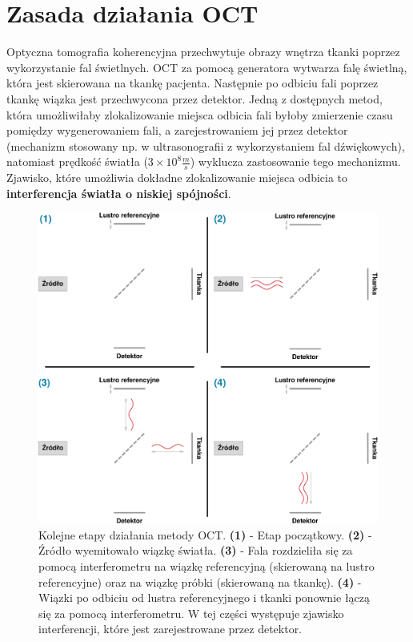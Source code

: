 
\section{Zasada działania OCT}
\label{sec:obrazowanie_oct:metoda_oct}

Optyczna tomografia koherencyjna przechwytuje obrazy wnętrza tkanki poprzez wykorzystanie fal świetlnych. OCT za pomocą generatora wytwarza falę świetlną, która jest skierowana na tkankę pacjenta. Następnie po odbiciu fali poprzez tkankę wiązka jest przechwycona przez detektor. Jedną z dostępnych metod, która umożliwiłaby zlokalizowanie miejsca odbicia fali byłoby zmierzenie czasu pomiędzy wygenerowaniem fali, a zarejestrowaniem jej przez detektor (mechanizm stosowany np. w ultrasonografii z wykorzystaniem fal dźwiękowych), natomiast prędkość światła (\(3\times10^8 \frac{m}{s}\)) wyklucza zastosowanie tego mechanizmu. Zjawisko, które umożliwia dokładne zlokalizowanie miejsca odbicia to \textbf{interferencja światła o niskiej spójności}.

\begin{figure}[htb]
	\centering
	\includegraphics[width=\textwidth]{gfx/oct_phases}
	\caption{Kolejne etapy działania metody OCT. \textbf{(1)} - Etap początkowy. \textbf{(2)} - Źródło wyemitowało wiązkę światła. \textbf{(3)} - Fala rozdzieliła się za pomocą interferometru na wiązkę referencyjną (skierowaną na lustro referencyjne) oraz na wiązkę próbki (skierowaną na tkankę). \textbf{(4)} - Wiązki po odbiciu od lustra referencyjnego i tkanki ponownie łączą się za pomocą interferometru. W tej części występuje zjawisko interferencji, które jest zarejestrowane przez detektor.}
	\label{fig:obrazowanie_oct:oct_phases}
\end{figure}

